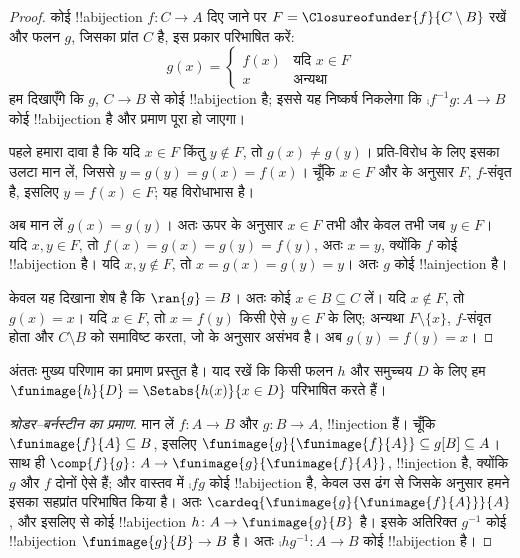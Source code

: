 \documentclass[../../../include/open-logic-section]{subfiles}
\begin{document}
\begin{proof}
कोई !!a{bijection} $f \colon C \to A$ दिए जाने पर $F =
\Closureofunder{f}{C \setminus B}$ रखें और फलन $g$, जिसका प्रांत $C$ है, इस
प्रकार परिभाषित करें:
\[
	g(x) = 
	\begin{cases}
			f(x) &\text{यदि $x \in F$}\\
			x & \text{अन्यथा}
		\end{cases}
\]
हम दिखाएँगे कि $g$, $C \to B$ से कोई !!a{bijection} है; इससे यह निष्कर्ष
निकलेगा कि $\comp{f^{-1}}{g} \colon A \to B$ कोई !!a{bijection} है और प्रमाण
पूरा हो जाएगा।

पहले हमारा दावा है कि यदि $x \in F$ किंतु $y\notin F$, तो $g(x) \neq
g(y)$। प्रति-विरोध के लिए इसका उलटा मान लें, जिससे $y = g(y) = g(x) =
f(x)$। चूँकि $x \in F$ और  के अनुसार $F$, $f$-संवृत है,
इसलिए $y = f(x) \in F$; यह विरोधाभास है।

अब मान लें $g(x) = g(y)$। अतः ऊपर के अनुसार $x \in F$ तभी और केवल तभी जब
$y \in F$। यदि $x, y \in F$, तो $f(x) = g (x) = g(y) = f(y)$, अतः $x = y$,
क्योंकि $f$ कोई !!a{bijection} है। यदि $x, y \notin F$, तो $x = g(x) =
g(y) = y$। अतः $g$ कोई !!a{injection} है।

केवल यह दिखाना शेष है कि $\ran{g} = B$। अतः कोई $x \in B \subseteq C$ लें।
यदि $x \notin F$, तो $g(x) = x$। यदि $x \in F$, तो $x = f(y)$ किसी ऐसे
$y \in F$ के लिए; अन्यथा $F \setminus \{x\}$, $f$-संवृत होता और $C\setminus B$
को समाविष्ट करता, जो  के अनुसार असंभव है। अब $g(y) = f(y) = x$।
\end{proof}

अंततः मुख्य परिणाम का प्रमाण प्रस्तुत है। याद रखें कि किसी फलन $h$ और समुच्चय
$D$ के लिए हम $\funimage{h}{D} = \Setabs{h(x)}{x
\in D}$ परिभाषित करते हैं।

\begin{proof}[श्रोडर--बर्नस्टीन का प्रमाण] मान लें $f \colon A \to B$
और $g \colon B \to A$, !!{injection} हैं। चूँकि $\funimage{f}{A}
\subseteq B$, इसलिए $\funimage{g}{\funimage{f}{A}} \subseteq
g[B] \subseteq A$। साथ ही $\comp{f}{g} \colon A \to
\funimage{g}{\funimage{f}{A}}$, !!{injection} है, क्योंकि $g$ और
$f$ दोनों ऐसे हैं; और वास्तव में $\comp{f}{g}$ कोई !!a{bijection} है, केवल
उस ढंग से जिसके अनुसार हमने इसका सहप्रांत परिभाषित किया है। अतः
$\cardeq{\funimage{g}{\funimage{f}{A}}}{A}$, और इसलिए  से कोई
!!a{bijection} $h \colon A \to
\funimage{g}{B}$ है। इसके अतिरिक्त $g^{-1}$ कोई !!a{bijection}
$\funimage{g}{B} \to B$ है। अतः $\comp{h}{g^{-1}} \colon A \to B$ कोई
!!a{bijection} है।
\end{proof}
\end{document}
